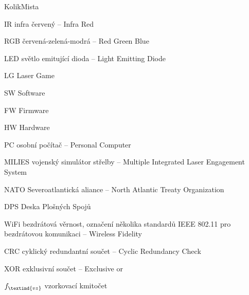 \begin{seznamzkratek}{KolikMista}

        {IR}
        {infra červený -- Infra Red}

        {RGB}
        {červená-zelená-modrá -- Red Green Blue}

        {LED}
        {světlo emitující dioda -- Light Emitting Diode}

        {LG}
        {Laser Game}

        {SW}
        {Software}

        {FW}
        {Firmware}

        {HW}
        {Hardware}

        {PC}
        {osobní počítač -- Personal Computer}

        {MILIES}
        {vojenský simulátor střelby -- Multiple Integrated Laser Engagement System}

        {NATO}
        {Severoatlantická aliance -- North Atlantic Treaty Organization}

        {DPS}
        {Deska Plošných Spojů}

        {WiFi}
        {bezdrátová věrnost, označení několika standardů IEEE 802.11 pro bezdrátovou komunikaci -- Wireless Fidelity}

        {CRC}
        {cyklický redundantní součet --  Cyclic Redundancy Check}

        {XOR}
        {exklusivní součet --  Exclusive or}

        {\ensuremath{f_\textind{vz}}}
        {vzorkovací kmitočet}

\end{seznamzkratek}
